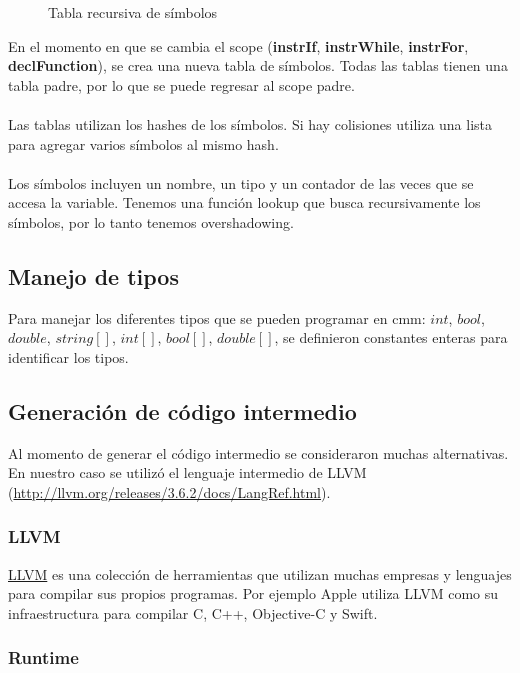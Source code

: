 \documentclass[11pt]{article}
\begin{document}
\begin{figure}[H]
    \centering
    \caption{Tabla recursiva de símbolos}
    \label{fig:symtabrec}
\end{figure}

En el momento en que se cambia el scope (\textbf{instrIf}, \textbf{instrWhile}, \textbf{instrFor}, \textbf{declFunction}), se 
crea una nueva tabla de símbolos. Todas las tablas tienen una tabla padre, por lo que se puede regresar al scope padre.
\\\\
Las tablas utilizan los hashes de los símbolos. Si hay colisiones utiliza una lista para agregar varios símbolos al mismo hash.
\\\\
Los símbolos incluyen un nombre, un tipo y un contador de las veces que se accesa la variable. Tenemos una función lookup que 
busca recursivamente los símbolos, por lo tanto tenemos overshadowing.

\subsection{Manejo de tipos}

Para manejar los diferentes tipos que se pueden programar en cmm: $int$, $bool$, $double$, $string[]$, $int[]$, $bool[]$, $double[]$, se definieron constantes enteras para identificar los tipos.

\subsection{Generación de código intermedio}

Al momento de generar el código intermedio se consideraron muchas alternativas. En nuestro caso se utilizó el lenguaje intermedio de LLVM (\url{http://llvm.org/releases/3.6.2/docs/LangRef.html}). 

\subsubsection{LLVM}

\href{https://en.wikipedia.org/wiki/LLVM}{LLVM} es una colección de herramientas que utilizan muchas empresas y lenguajes para compilar sus propios programas. Por ejemplo Apple utiliza LLVM como su infraestructura para compilar C, C++, Objective-C y Swift. 

\subsubsection{Runtime}
\end{document}
